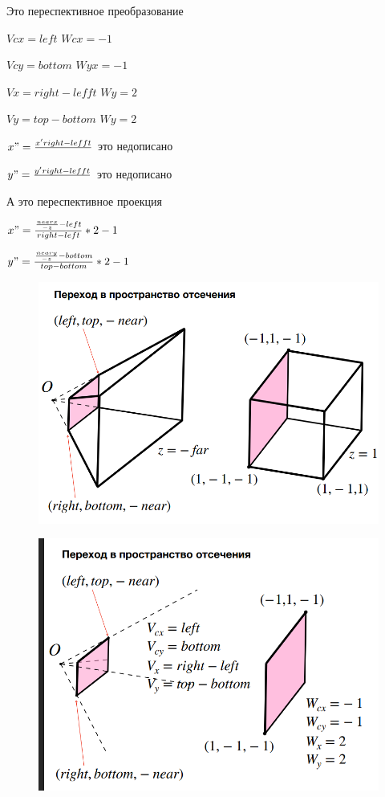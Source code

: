 \documentclass{article}
\begin{document}
Это переспективное преобразование

$Vcx = left$     \hspace{2cm}  $Wcx = -1$

$Vcy = bottom$  \hspace{2cm}    $Wyx = -1$

$Vx = right-lefft$  \hspace{2cm} $Wy = 2$

$Vy = top-bottom$   \hspace{2cm} $Wy = 2$

$x" = \frac{x'right-lefft}{}$ это недописано

$y" = \frac{y'right-lefft}{}$ это недописано

А это переспективное проекция

$x"=\frac{\frac{nearx}{-z}-left}{right - left}*2-1$

$y"=\frac{\frac{neary}{-z}-bottom}{top - bottom}*2-1$






\begin{figure} [H]
    \includegraphics[width=0.70\linewidth]{Снимок экрана 2025-04-07 122537.png}
\end{figure}


\begin{figure} [H]
    \includegraphics[width=0.70\linewidth]{Снимок экрана 2025-04-07 122544.png}
\end{figure}
\end{document}
